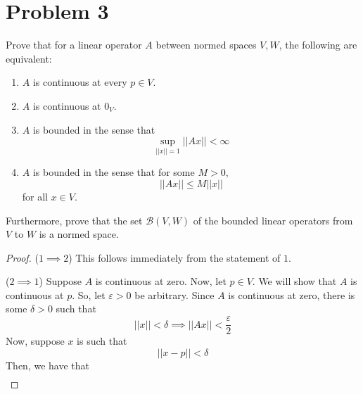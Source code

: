 \documentclass[fontsize=11pt]{scrartcl} %
\numberwithin{equation}{section} %
\numberwithin{figure}{section} %
\numberwithin{table}{section} %
\begin{document}
\section*{Problem 3}
Prove that for a linear operator $A$ between normed spaces $V,W$, the following
are equivalent:
\begin{enumerate}
    \item $A$ is continuous at every $p\in V$.
    \item $A$ is continuous at $0_V$.
    \item $A$ is bounded in the sense that 
        \[
            \sup_{||x||=1} ||Ax|| < \infty
        \]
    \item $A$ is bounded in the sense that for some $M>0$,
        \[
            ||Ax||\leq M||x||
        \]
        for all $x\in V$.
\end{enumerate}
Furthermore, prove that the set $\mathscr{B}(V,W)$ of the bounded linear
operators from $V$ to $W$ is a normed space.
\\
\begin{proof}
    ($1\implies 2$)
    This follows immediately from the statement of $1$.

    ($2\implies 1$)
    Suppose $A$ is continuous at zero. Now, let $p\in V$. We will show that $A$
    is continuous at $p$. So, let $\varepsilon>0$ be arbitrary.
    Since $A$ is continuous at zero, there is some $\delta>0$ such that
    \[
        ||x||<\delta\implies||Ax||<\frac{\varepsilon}{2}
    \]
    Now, suppose $x$ is such that
    \[
    ||x-p||<\delta
    \]
    Then, we have that
    \[
        \begin{aligned}
        \end{aligned}
    \]
\end{proof}



\end{document}
